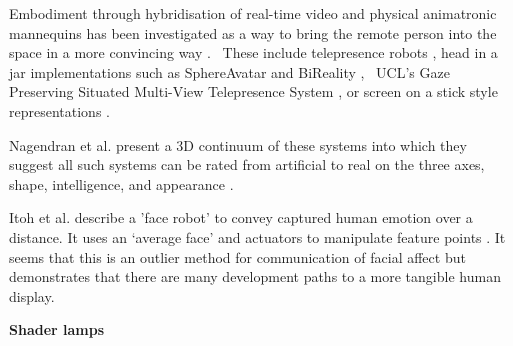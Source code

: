                     Embodiment through hybridisation of real-time video and physical animatronic mannequins has been investigated as a way to bring the remote person into the space in a more convincing way \cite{Lincoln2009, Lincoln:2010it, Raskar2001a}. \ These include telepresence robots \cite{Lee2011b, Sakamoto2007, Tsui2011}, head in a jar implementations such as SphereAvatar \cite{Oyekoya2012, pan2014comparing, Pan2012a} and BiReality \cite{Jouppi2004}, \ UCL's Gaze Preserving Situated Multi-View Telepresence System \cite{Pan2014a}, or screen on a stick style representations \cite{Kristoffersson2013}.\par  
                    Nagendran et al. present a 3D continuum of these systems into which they suggest all such systems can be rated from artificial to real on the three axes, shape, intelligence, and appearance \cite{Nagendran}.\par
                    Itoh et al. describe a 'face robot' to convey captured human emotion over a distance. It uses an `average face' and actuators to manipulate feature points \cite{Itoh2005}. It seems that this is an outlier method for communication of facial affect but demonstrates that there are many development paths to a more tangible human display.\par 
                    
\textbf{Shader lamps}

